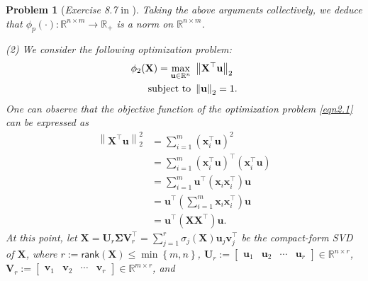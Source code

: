 \documentclass[11pt]{article}
\newtheorem{problem}{Problem}
\numberwithin{equation}{problem}
\begin{document}
\begin{problem} [\emph{Exercise 8.7} in \cite{calafiore2014optimization}]
{\indent Taking the above arguments collectively, we deduce that $\phi_p (\cdot) : \mathbb{R}^{n \times m} \rightarrow \mathbb{R}_{+}$ is a norm on $\mathbb{R}^{n \times m}$. 
\medskip

\indent (2) We consider the following optimization problem:
\begin{equation}
    \label{eqn2.1}
    \begin{split}
        \phi_2 (\mathbf{X}) = \max_{\mathbf{u} \in \mathbb{R}^n} \ & \left\| \mathbf{X}^{\top} \mathbf{u} \right\|_2 \\
        \textnormal{subject to }& \left\| \mathbf{u} \right\|_2 = 1.
    \end{split}
\end{equation}
One can observe that the objective function of the optimization problem \eqref{eqn2.1} can be expressed as
\begin{equation}
    \label{eqn2.2}
    \begin{split}
        \left\| \mathbf{X}^{\top} \mathbf{u} \right\|_{2}^2
        &= \sum_{i=1}^{m} \left( \mathbf{x}_{i}^{\top} \mathbf{u} \right)^2 \\
        &= \sum_{i=1}^{m} \left( \mathbf{x}_{i}^{\top} \mathbf{u} \right)^{\top} \left( \mathbf{x}_{i}^{\top} \mathbf{u} \right) \\
        &= \sum_{i=1}^{m} \mathbf{u}^{\top} \left( \mathbf{x}_{i} \mathbf{x}_{i}^{\top} \right) \mathbf{u} \\
        &= \mathbf{u}^{\top} \left( \sum_{i=1}^{m} \mathbf{x}_{i} \mathbf{x}_{i}^{\top} \right) \mathbf{u} \\
        &= \mathbf{u}^{\top} \left( \mathbf{X} \mathbf{X}^{\top} \right) \mathbf{u}.
    \end{split}
\end{equation}
At this point, let $\mathbf{X} = \mathbf{U}_r \mathbf{\Sigma} \mathbf{V}_{r}^{\top} = \sum_{j=1}^{r} \sigma_j (\mathbf{X}) \mathbf{u}_j \mathbf{v}_{j}^{\top}$ be the compact-form \textsf{SVD} of $\mathbf{X}$, where $r := \textsf{rank}(\mathbf{X}) \leq \min \left\{ m, n \right\}$, $\mathbf{U}_r := \begin{bmatrix} \mathbf{u}_1 & \mathbf{u}_2 & \cdots & \mathbf{u}_r \end{bmatrix} \in \mathbb{R}^{n \times r}$, $\mathbf{V}_r := \begin{bmatrix} \mathbf{v}_1 & \mathbf{v}_2 & \cdots & \mathbf{v}_r \end{bmatrix} \in \mathbb{R}^{m \times r}$, and
\begin{equation*}

\end{equation*}}
\end{problem}
\end{document}
